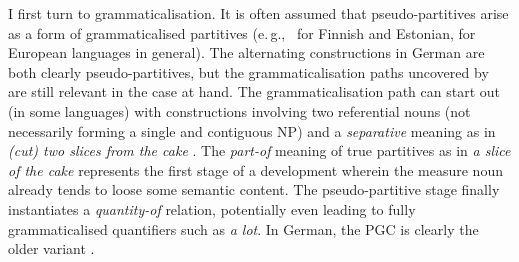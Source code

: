 \documentclass[USenglish]{article}
\newcommand{\eg}{e.\,g.,}
\begin{document}
I first turn to grammaticalisation.
It is often assumed that pseudo-partitives arise as a form of grammaticalised partitives (\eg\ \citealp[536--539]{Koptjevskaja2001} for Finnish and Estonian, \citealp[559]{Koptjevskaja2001} for European languages in general).
%
%
%
%
The alternating constructions in German are both clearly pseudo-partitives, but the grammaticalisation paths uncovered by \citet[esp.\ 526--530]{Koptjevskaja2001} are still relevant in the case at hand.
The grammaticalisation path can start out (in some languages) with constructions involving two referential nouns (not necessarily forming a single and contiguous NP) and a \textit{separative} meaning as in \textit{(cut) two slices from the cake} \citep[535]{Koptjevskaja2001}.
The \textit{part-of} meaning of true partitives as in \textit{a slice of the cake} represents the first stage of a development wherein the measure noun already tends to loose some semantic content.
The pseudo-partitive stage finally instantiates a \textit{quantity-of} relation, potentially even leading to fully grammaticalised quantifiers such as \textit{a lot}.
In German, the PGC is clearly the older variant \citep{Zimmer2015}.
\end{document}
